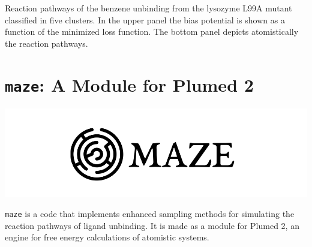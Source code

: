\documentclass[a0,portrait]{a0poster}
\begin{document}
\begin{multicols}{2}
\noindent Reaction pathways of the benzene unbinding from the lysozyme L99A mutant
classified in five clusters.  In the upper panel the bias potential is shown as
a function of the minimized loss function. The bottom panel depicts
atomistically the reaction pathways.

\section*{\huge\centering\color{myblue}\texttt{maze}: A Module for Plumed
2~\cite{3}}
\vspace*{1cm}
\begin{minipage}[b]{\linewidth}
  \centering
  \includegraphics[width=20cm]{../fig/maze-icon.png}
\end{minipage}
\vspace*{1cm}

\noindent\texttt{maze} is a code that implements enhanced sampling methods for simulating 
the reaction pathways of ligand unbinding. It is made as a module for Plumed 2, an
engine for free energy calculations of atomistic systems.
\vspace*{1cm}


\end{multicols}
\end{document}
